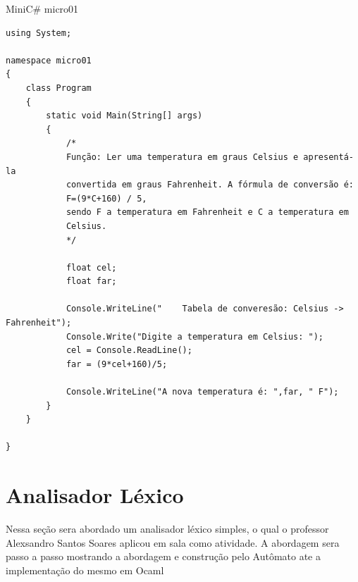 \documentclass{article}
\begin{document}
MiniC\# micro01
\begin{lstlisting}
using System;

namespace micro01
{
	class Program
	{
		static void Main(String[] args)
		{
			/*
			Função: Ler uma temperatura em graus Celsius e apresentá-la
			convertida em graus Fahrenheit. A fórmula de conversão é:
			F=(9*C+160) / 5,
			sendo F a temperatura em Fahrenheit e C a temperatura em
			Celsius.
			*/

			float cel;
			float far;

			Console.WriteLine("    Tabela de converesão: Celsius -> Fahrenheit");
			Console.Write("Digite a temperatura em Celsius: ");
			cel = Console.ReadLine();
			far = (9*cel+160)/5;

			Console.WriteLine("A nova temperatura é: ",far, " F");
		}
	}

}
\end{lstlisting}


\section{Analisador Léxico}
Nessa seção sera abordado um analisador léxico simples, o qual o professor Alexsandro Santos Soares aplicou em sala como atividade. A abordagem sera passo a passo mostrando a abordagem e construção pelo Autômato ate a implementação do mesmo em Ocaml\\\
\end{document}
